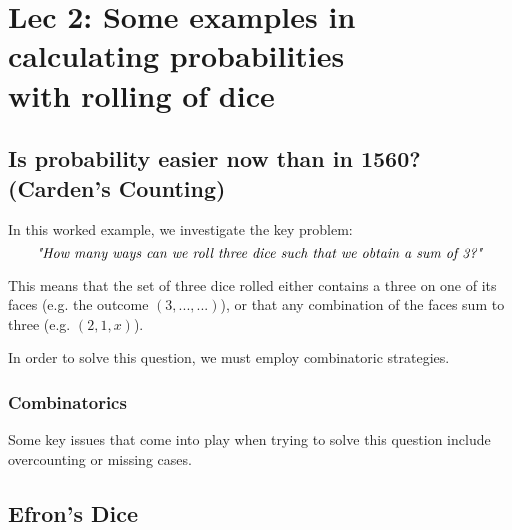 \chapter[Lec 2: Some examples in calculating probabilities with rolling of dice]{Lec 2: Some examples in \\calculating probabilities \\with rolling of dice}

\section{Is probability easier now than in 1560? (Carden's Counting)}

In this worked example, we investigate the key problem: 
\[\text{\textit{"How many ways can we roll three dice such that we obtain a sum of 3?"}}\]

This means that the set of three dice rolled either contains 
a three on one of its faces (e.g. the outcome \((3,...,...)\)), 
or that any combination of the faces sum to three (e.g. \((2,1,x)\)). 

\bigskip 

In order to solve this question, we must employ combinatoric strategies. 

\subsection{Combinatorics}





Some key issues that come into play when trying to solve this question include 
overcounting or missing cases. 

\section{Efron's Dice}


